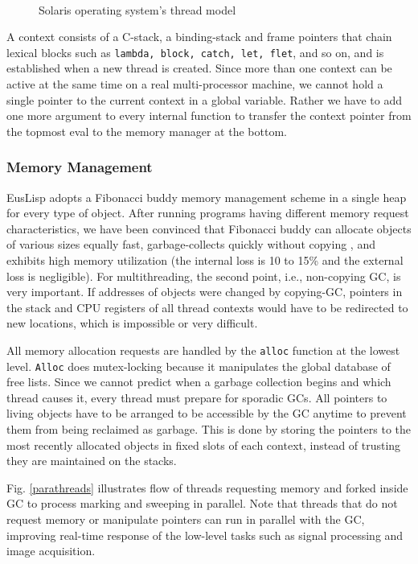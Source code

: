 \begin{figure}[b]
\begin{center}
\mbox{
\epsfxsize=13cm
}

\caption{Solaris operating system's thread model}\label{threadmodel}
\end{center}
\end{figure}

A context consists of a C-stack, a binding-stack and frame 
pointers that chain lexical blocks such as {\tt lambda, block, catch,
let, flet}, and so on,  and is established when a new thread
is created. Since more than one context can be active at
the same time on a real multi-processor machine, we cannot
hold a single pointer to the current context in a global variable.
Rather we have to add one more argument to every internal
function to transfer the context pointer  from the topmost eval
to the memory manager at the bottom.

\subsubsection{Memory Management}
EusLisp adopts a Fibonacci buddy memory management scheme in a
single heap for every type of object. 
After running programs having
different memory request characteristics, we have been convinced that
Fibonacci buddy can allocate objects of various sizes equally fast,
garbage-collects quickly without copying , and exhibits high memory
utilization (the internal loss is 10 to 15\% and the
external loss is negligible).
For multithreading, the second point, i.e., non-copying GC, is very
important.
If addresses of objects were changed by copying-GC, pointers in the
stack and CPU registers of all thread contexts would have to be
redirected to new locations, which is impossible or very difficult. 

All memory allocation requests are handled by the {\tt alloc} function at the
lowest level.
{\tt Alloc} does mutex-locking because it manipulates the global
database of free lists.
Since we cannot predict when a garbage
collection begins and which thread causes it, every thread must prepare
for sporadic GCs.  All pointers to living objects have to be arranged
to be accessible by the GC anytime to prevent them from being reclaimed
as garbage.  This is done by storing the pointers to the most recently
allocated objects in fixed slots of each context, instead of trusting
they are maintained on the stacks.

Fig. \ref{parathreads} illustrates flow of threads requesting memory and forked inside
GC to process marking and sweeping in parallel.
Note that threads that do not request memory or manipulate pointers
can run in parallel with the GC,
improving real-time response of the low-level tasks such as signal
processing and image acquisition.

